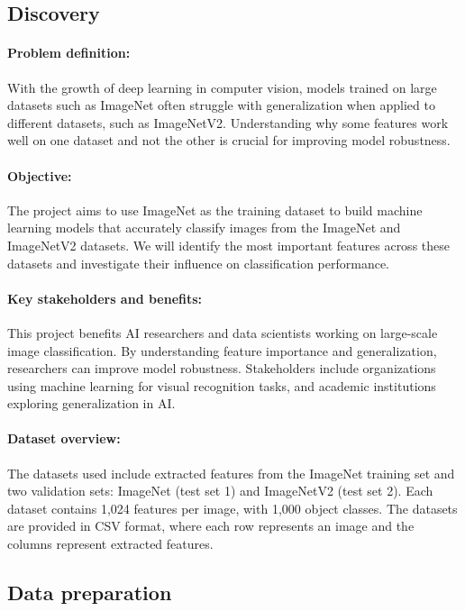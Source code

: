 \documentclass[a4paper,11pt]{article}
\begin{document}
\subsection{Discovery}
\paragraph{Problem definition:}  
With the growth of deep learning in computer vision, models trained on large datasets such as ImageNet often struggle with generalization when applied to different datasets, such as ImageNetV2. Understanding why some features work well on one dataset and not the other is crucial for improving model robustness.

\paragraph{Objective:}  
The project aims to use ImageNet as the training dataset to build machine learning models that accurately classify images from the ImageNet and ImageNetV2 datasets. We will identify the most important features across these datasets and investigate their influence on classification performance.

\paragraph{Key stakeholders and benefits:}  
This project benefits AI researchers and data scientists working on large-scale image classification. By understanding feature importance and generalization, researchers can improve model robustness. Stakeholders include organizations using machine learning for visual recognition tasks, and academic institutions exploring generalization in AI.

\paragraph{Dataset overview:}
The datasets used include extracted features from the ImageNet training set and two validation sets: ImageNet (test set 1) and ImageNetV2 (test set 2). Each dataset contains 1,024 features per image, with 1,000 object classes. The datasets are provided in CSV format, where each row represents an image and the columns represent extracted features.

\subsection{Data preparation}
\end{document}
